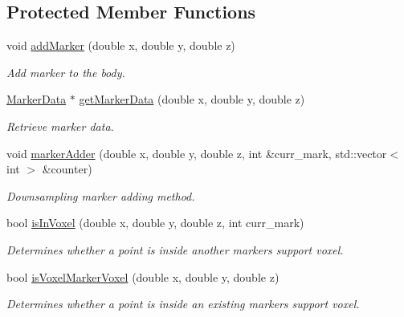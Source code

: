 \subsection*{Protected Member Functions}
\begin{DoxyCompactItemize}
\item 
void \hyperlink{class_body_aa965f7b498528230aa2f56a9abf6bf06}{add\+Marker} (double x, double y, double z)
\begin{DoxyCompactList}\small\item\em Add marker to the body. \end{DoxyCompactList}\item 
\hyperlink{class_marker_data}{Marker\+Data} $\ast$ \hyperlink{class_body_aebc3c7911b4ad10b1f9853d3f5fc7514}{get\+Marker\+Data} (double x, double y, double z)
\begin{DoxyCompactList}\small\item\em Retrieve marker data. \end{DoxyCompactList}\item 
void \hyperlink{class_body_a3a1ba74da8020cc3ee7f4fffde0b4477}{marker\+Adder} (double x, double y, double z, int \&curr\+\_\+mark, std\+::vector$<$ int $>$ \&counter)
\begin{DoxyCompactList}\small\item\em Downsampling marker adding method. \end{DoxyCompactList}\item 
bool \hyperlink{class_body_aa7733bbcd85af5fa4e8822889fba7b33}{is\+In\+Voxel} (double x, double y, double z, int curr\+\_\+mark)
\begin{DoxyCompactList}\small\item\em Determines whether a point is inside another marker\textquotesingle{}s support voxel. \end{DoxyCompactList}\item 
bool \hyperlink{class_body_a3ed926c01461f32d64b4a5405e920e36}{is\+Voxel\+Marker\+Voxel} (double x, double y, double z)
\begin{DoxyCompactList}\small\item\em Determines whether a point is inside an existing marker\textquotesingle{}s support voxel. \end{DoxyCompactList}\end{DoxyCompactItemize}
